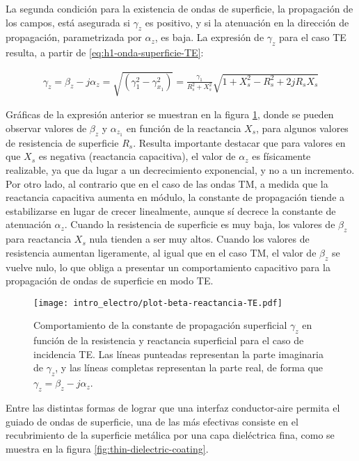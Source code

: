 La segunda condición para la existencia de ondas de superficie, la propagación de los campos, está asegurada si $\gamma_z$ es positivo, y si la atenuación en la dirección de propagación, parametrizada por $\alpha_z$, es baja. La expresión de $\gamma_z$ para el caso TE resulta, a partir de \ref{eq:h1-onda-superficie-TE}:

\begin{align}
	\gamma_z = \beta_z-j\alpha_z= \sqrt{(\gamma_1^2 - \gamma_{x_1}^2)} = \frac{\gamma_1}{R_s^2+X_s^2} \sqrt{1+X_s^2 - R_s^2 + 2jR_s X_s} \label{eq:beta-onda-superficie-TE}
\end{align}

Gráficas de la expresión anterior se muestran en la figura \ref{fig:beta-reactancia-TE}, donde se pueden observar valores de $\beta_z$ y $\alpha_{z_1}$ en función de la reactancia $X_s$, para algunos valores de resistencia de superficie $R_s$. Resulta importante destacar que para valores en que $X_s$ es negativa (reactancia capacitiva), el valor de $\alpha_z$ es físicamente realizable, ya que da lugar a un decrecimiento exponencial, y no a un incremento. Por otro lado, al contrario que en el caso de las ondas TM, a medida que la reactancia capacitiva aumenta en módulo, la constante de propagación tiende a estabilizarse en lugar de crecer linealmente, aunque sí decrece la constante de atenuación $\alpha_z$. Cuando la resistencia de superficie es muy baja, los valores de $\beta_z$ para reactancia $X_s$ nula tienden a ser muy altos. Cuando los valores de resistencia aumentan ligeramente, al igual que en el caso TM, el valor de $\beta_z$ se vuelve nulo, lo que obliga a presentar un comportamiento capacitivo para la propagación de ondas de superficie en modo TE.


\begin{figure}[htp]
	\centering
	\texttt{[image: intro\_electro/plot-beta-reactancia-TE.pdf]}
	\caption{Comportamiento de la constante de propagación superficial $\gamma_z$ en función de la resistencia y reactancia superficial para el caso de incidencia TE. Las líneas punteadas representan la parte imaginaria de $\gamma_z$, y las líneas completas representan la parte real, de forma que $\gamma_z = \beta_z - j\alpha_z$.}
	\label{fig:beta-reactancia-TE}
\end{figure}

Entre las distintas formas de lograr que una interfaz conductor-aire permita el guiado de ondas de superficie, una de las más efectivas consiste en el recubrimiento de la superficie metálica por una capa dieléctrica fina, como se muestra en la figura \ref{fig:thin-dielectric-coating}.

